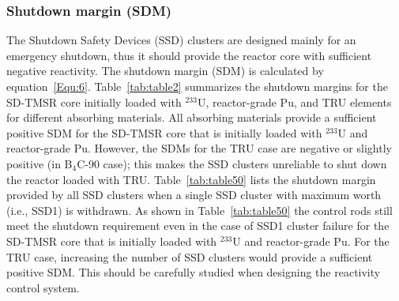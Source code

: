 \subsubsection{Shutdown margin (SDM)}

The Shutdown Safety Devices (SSD) clusters are designed mainly for an emergency shutdown, thus it should 
provide the reactor core with sufficient negative reactivity. The 
shutdown margin (SDM) is calculated by equation~\ref{Equ:6}.
Table~\ref{tab:table2} summarizes the shutdown margins for the SD-TMSR core 
initially loaded with $^{233}$U, reactor-grade Pu, and TRU 
elements for different absorbing materials. All absorbing materials provide a sufficient positive
SDM for the SD-TMSR core that is initially loaded with 
$^{233}$U and reactor-grade Pu. However, the SDMs for the TRU case are 
negative or slightly positive (in B$_4$C-90 case); this makes the SSD clusters 
unreliable to shut down the reactor loaded with TRU. Table~\ref{tab:table50} lists the shutdown margin provided by all SSD clusters when a single SSD cluster with maximum worth (i.e., SSD1) is withdrawn. As shown in Table~\ref{tab:table50} the control rods still meet the shutdown requirement even in the case of SSD1 cluster failure for the SD-TMSR core that is initially loaded with $^{233}$U and reactor-grade Pu. For the TRU case, increasing the number of SSD clusters would provide a sufficient positive SDM. This should be carefully studied when designing the reactivity control system. 

